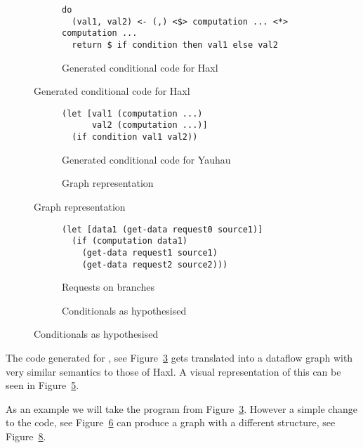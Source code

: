\begin{figure}[h]
\begin{subfigure}{\textwidth}
\begin{verbatim}
do
  (val1, val2) <- (,) <$> computation ... <*> computation ...
  return $ if condition then val1 else val2
\end{verbatim}
\caption{Generated conditional code for Haxl}
\label{fig:generated-conditional-haxl}
\end{subfigure}

\end{figure}


\begin{figure}
  \begin{subfigure}[b]{.5\textwidth}
\begin{verbatim}
(let [val1 (computation ...)
      val2 (computation ...)]
  (if condition val1 val2))
\end{verbatim}
  \caption{Generated conditional code for Yauhau}
  \label{fig:generated-conditional-yauhau}
  \end{subfigure}
  \begin{subfigure}[b]{0.5\textwidth}
    \caption{Graph representation}
    \label{fig:if-graph-actual}
  \end{subfigure}
\end{figure}

\begin{figure}
  \begin{subfigure}{\textwidth}
\begin{verbatim}
(let [data1 (get-data request0 source1)]
  (if (computation data1)
    (get-data request1 source1)
    (get-data request2 source2)))
\end{verbatim}
    \caption{Requests on branches}
    \label{fig:requests-on-branches}
  \end{subfigure}
  \begin{subfigure}{0.5\textwidth}
    \caption{Conditionals as hypothesised}
    \label{fig:if-graph-hypothesised}
  \end{subfigure}
\end{figure}

The code generated for \yauhau{}, see Figure~\ref{fig:generated-conditional-yauhau} gets translated into a dataflow graph with very similar semantics to those of Haxl.
A visual representation of this can be seen in Figure~\ref{fig:if-graph-actual}.

As an example we will take the program from Figure~\ref{fig:generated-conditional-yauhau}.
However a simple change to the \yauhau{} code, see Figure~\ref{fig:requests-on-branches} can produce a graph with a different structure, see Figure~\ref{fig:if-graph-hypothesised}.


